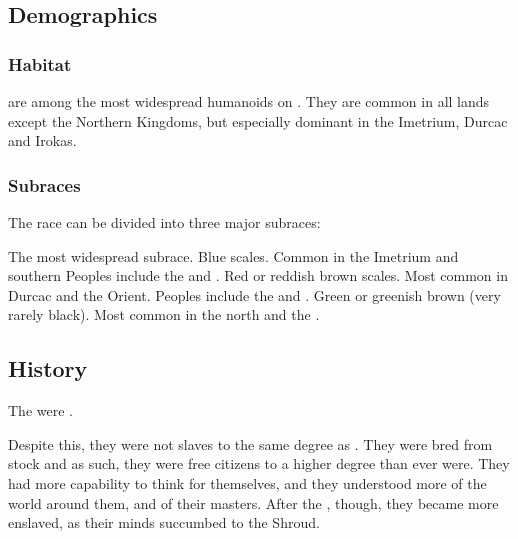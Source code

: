 \subsection{Demographics}
\subsubsection{Habitat}
\Scathae{} are among the most widespread humanoids on \Miith{}. 
They are common in all lands except the Northern Kingdoms, but especially dominant in the Imetrium, Durcac and Irokas. 





\subsubsection{Subraces}
The \scathaese{} race can be divided into three major subraces: 

\begin{gloss}
  \gitem[\Tassians]{\Tassian}
    The most widespread subrace. 
    Blue scales. 
    Common in the Imetrium and southern \Velcad{}
    Peoples include the  and . 
  \gitem[\Mekriis]{\Mekrii}
    Red or reddish brown scales.
    Most common in Durcac and the Orient. 
    Peoples include the  and . 
  \gitem[\Lois]{\Loi}
    Green or greenish brown (very rarely black).
    Most common in the north and the \Serplands. 
\end{gloss}










\subsection{History}
The \scathae{} were . 

Despite this, they were not slaves to the same degree as \humans. 
They were bred from \naga{} stock and as such, they were free citizens to a higher degree than \humans{} ever were. 
They had more capability to think for themselves, and they understood more of the world around them, and of their masters. 
After the , though, they became more enslaved, as their minds succumbed to the Shroud.


